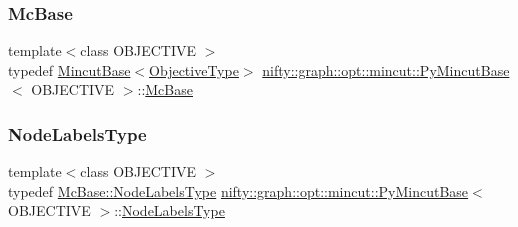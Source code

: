 \mbox{\label{classnifty_1_1graph_1_1opt_1_1mincut_1_1PyMincutBase_a2d5ad5e3ada1a7a4264ad3a20575a5a7}} 
\subsubsection{\texorpdfstring{Mc\+Base}{McBase}}
{\footnotesize\ttfamily template$<$class O\+B\+J\+E\+C\+T\+I\+VE $>$ \\
typedef \hyperlink{classnifty_1_1graph_1_1opt_1_1mincut_1_1MincutBase}{Mincut\+Base}$<$\hyperlink{classnifty_1_1graph_1_1opt_1_1mincut_1_1PyMincutBase_ad5ee76481f2aeb8544717a69b2760a6b}{Objective\+Type}$>$ \hyperlink{classnifty_1_1graph_1_1opt_1_1mincut_1_1PyMincutBase}{nifty\+::graph\+::opt\+::mincut\+::\+Py\+Mincut\+Base}$<$ O\+B\+J\+E\+C\+T\+I\+VE $>$\+::\hyperlink{classnifty_1_1graph_1_1opt_1_1mincut_1_1PyMincutBase_a2d5ad5e3ada1a7a4264ad3a20575a5a7}{Mc\+Base}}

\mbox{\label{classnifty_1_1graph_1_1opt_1_1mincut_1_1PyMincutBase_a54c8146f750e7085a430228c3082a0cf}} 
\subsubsection{\texorpdfstring{Node\+Labels\+Type}{NodeLabelsType}}
{\footnotesize\ttfamily template$<$class O\+B\+J\+E\+C\+T\+I\+VE $>$ \\
typedef \hyperlink{classnifty_1_1graph_1_1opt_1_1common_1_1SolverBase_abefd51561de2fd009f6bed6bef6009ea}{Mc\+Base\+::\+Node\+Labels\+Type} \hyperlink{classnifty_1_1graph_1_1opt_1_1mincut_1_1PyMincutBase}{nifty\+::graph\+::opt\+::mincut\+::\+Py\+Mincut\+Base}$<$ O\+B\+J\+E\+C\+T\+I\+VE $>$\+::\hyperlink{classnifty_1_1graph_1_1opt_1_1mincut_1_1PyMincutBase_a54c8146f750e7085a430228c3082a0cf}{Node\+Labels\+Type}}

